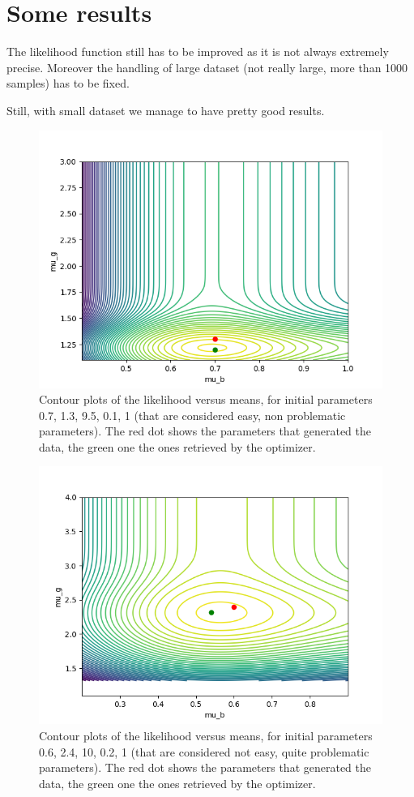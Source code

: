\documentclass{article}
\begin{document}
\section{Some results}

The likelihood function still has to be improved as it is not always extremely precise. Moreover the handling of large dataset (not really large, more than 1000 samples) has to be fixed.

Still, with small dataset we manage to have pretty good results.

\begin{figure}
  \centering
  \includegraphics[width=.8\textwidth]{img/contour_mus.png}
  \caption{Contour plots of the likelihood versus means, for initial parameters 0.7, 1.3, 9.5, 0.1, 1 (that are considered easy, non problematic parameters). The red dot shows the parameters that generated the data, the green one the ones retrieved by the optimizer.}
  \label{fig:easy_par}
\end{figure}


\begin{figure}
  \centering
  \includegraphics[width=.8\textwidth]{img/contour_mus_not_converging.png}
  \caption{Contour plots of the likelihood versus means, for initial parameters 0.6, 2.4, 10, 0.2, 1 (that are considered not easy, quite problematic parameters). The red dot shows the parameters that generated the data, the green one the ones retrieved by the optimizer.}
  \label{fig:diff_par}
\end{figure}
\end{document}
